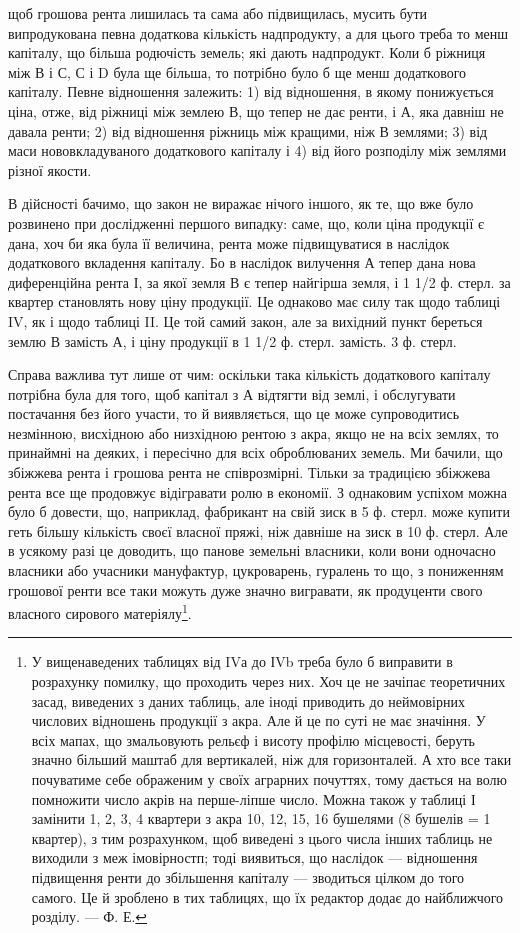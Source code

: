 щоб грошова рента лишилась та сама або підвищилась, мусить бути випродукована
певна додаткова кількість надпродукту, а для цього треба то менш
капіталу, що більша родючість земель; які дають надпродукт. Коли б ріжниця
між В і С, С і D була ще більша, то потрібно було б ще менш додаткового
капіталу. Певне відношення залежить: 1) від відношення, в якому понижується
ціна, отже, від ріжниці між землею В, що тепер не дає ренти, і А, яка давніш
не давала ренти; 2) від відношення ріжниць між кращими, ніж В землями; 3) від
маси нововкладуваного додаткового капіталу і 4) від його розподілу між землями
різної якости.

В дійсності бачимо, що закон не виражає нічого іншого, як те, що вже
було розвинено при дослідженні першого випадку: саме, що, коли ціна продукції
є дана, хоч би яка була її величина, рента може підвищуватися в наслідок
додаткового вкладення капіталу. Бо в наслідок вилучення А тепер дана нова диференційна
рента І, за якої земля В є тепер найгірша земля, і 1 1/2 ф. стерл. за
квартер становлять нову ціну продукції. Це однаково має силу так щодо таблиці
IV, як і щодо таблиці II. Це той самий закон, але за вихідний
пункт береться землю В замість А, і ціну продукції в 1 1/2 ф. стерл. замість.
3 ф. стерл.

Справа важлива тут лише от чим: оскільки така кількість додаткового
капіталу потрібна була для того, щоб капітал з А відтягти від землі, і обслугувати
постачання без його участи, то й виявляється, що це може супроводитись
незмінною, висхідною або низхідною рентою з акра, якщо не на всіх землях, то
принаймні на деяких, і пересічно для всіх оброблюваних земель. Ми бачили, що
збіжжева рента і грошова рента не співрозмірні. Тільки за традицією збіжжева
рента все ще продовжує відігравати ролю в економії. З однаковим успіхом можна
було б довести, що, наприклад, фабрикант на свій зиск в 5 ф. стерл. може купити
геть більшу кількість своєї власної пряжі, ніж давніше на зиск в 10 ф. стерл.
Але в усякому разі це доводить, що панове земельні власники, коли вони одночасно
власники або учасники мануфактур, цукроварень, гуралень то що, з пониженням
грошової ренти все таки можуть дуже значно вигравати, як продуценти
свого власного сирового матеріялу\footnote{
У вищенаведених таблицях від IVа до ІVb треба було б виправити в розрахунку помилку, що
проходить через них. Хоч це не зачіпає теоретичних засад, виведених з даних таблиць, але іноді
приводить до неймовірних числових відношень продукції з акра. Але й це по суті не має значіння. У
всіх мапах, що змальовують рельєф і висоту профілю місцевості, беруть значно більший маштаб для
вертикалей, ніж для горизонталей. А хто все таки почуватиме себе ображеним у своїх аграрних
почуттях, тому дається на волю помножити число акрів на перше-ліпше число. Можна також у таблиці І
замінити 1, 2, 3, 4 квартери з акра 10, 12, 15, 16 бушелями (8 бушелів = 1 квартер), з тим
розрахунком, щоб виведені з цього числа інших таблиць не виходили з меж імовірностп; тоді виявиться,
що наслідок — відношення підвищення ренти до збільшення капіталу — зводиться цілком до того самого.
Це й зроблено в тих таблицях, що їх редактор додає до найближчого розділу. — Ф. Е.
}.

